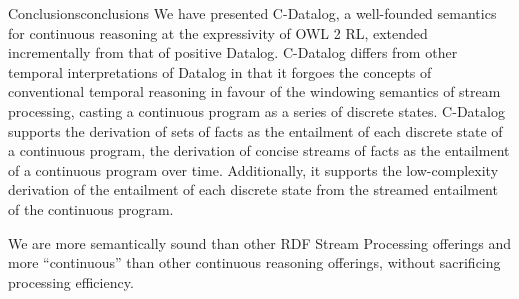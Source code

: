 \begin{nestedsection}{Conclusions}{conclusions}
	We have presented C-Datalog, a well-founded semantics for continuous reasoning at the expressivity of OWL 2 RL, extended incrementally from that of positive Datalog.
	C-Datalog differs from other temporal interpretations of Datalog \citep{TODO} in that it forgoes the concepts of conventional temporal reasoning in favour of the windowing semantics of stream processing, casting a continuous program as a series of discrete states.
	C-Datalog supports the derivation of sets of facts as the entailment of each discrete state of a continuous program, the derivation of concise streams of facts as the entailment of a continuous program over time.
	Additionally, it supports the low-complexity derivation of the entailment of each discrete state from the streamed entailment of the continuous program.

	We are more semantically sound than other RDF Stream Processing offerings and more ``continuous'' than other continuous reasoning offerings, without sacrificing processing efficiency.

\end{nestedsection}